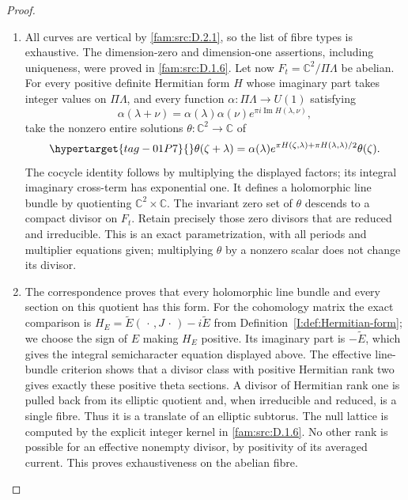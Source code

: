 \begin{proof}
\begin{enumerate}[label=\arabic*.,leftmargin=*]
\item \hypertarget{tag-000H}{}\label{app:rederive:fam-src-D.2.3}
All curves are vertical by \ref{fam:src:D.2.1}, so the list of fibre types is exhaustive.
The dimension-zero and dimension-one assertions, including uniqueness,
were proved in \ref{fam:src:D.1.6}. Let now $F_t=\mathbb C^2/\Pi\Lambda$ be abelian.
For every positive definite Hermitian form $H$ whose imaginary part takes
integer values on $\Pi\Lambda$, and every function
$\alpha:\Pi\Lambda\to U(1)$ satisfying
\[
 \alpha(\lambda+\nu)=\alpha(\lambda)\alpha(\nu)
                 e^{\pi i\operatorname{Im}H(\lambda,\nu)},
\]
take the nonzero entire solutions $\theta:\mathbb C^2\to\mathbb C$ of
\begin{equation}\hypertarget{tag-01P7}{}\label{fam:eq:cd-theta-sections}
 \theta(\zeta+\lambda)=\alpha(\lambda)
 e^{\pi H(\zeta,\lambda)+\pi H(\lambda,\lambda)/2}\theta(\zeta).
\end{equation}
The cocycle identity follows by multiplying the displayed factors; its
integral imaginary cross-term has exponential one. It defines a
holomorphic line bundle by quotienting $\mathbb C^2\times\mathbb C$.
The invariant zero set of $\theta$ descends to a compact divisor on
$F_t$. Retain precisely those zero divisors that are reduced and
irreducible. This is an exact parametrization, with all periods and
multiplier equations given; multiplying $\theta$ by a nonzero scalar
does not change its divisor.

\item The correspondence \cite[Theorem 4.1, p.~1, and equation (4.3), p.~2]{Schnell19} proves
that every holomorphic line bundle and every section on this quotient
has this form. For the cohomology matrix the exact comparison is
$H_E=\widetilde E(\,\cdot\,,J\,\cdot\,)-i\widetilde E$ from Definition~\ref{I:def:Hermitian-form};
we choose the sign of $E$ making $H_E$ positive. Its imaginary part is
$-\widetilde E$, which gives the integral semicharacter equation displayed
above. The effective line-bundle criterion \cite[pp.~2--3]{Schnell19} shows that
a divisor class with positive Hermitian rank two gives exactly
these positive theta sections. A divisor of Hermitian rank one is pulled
back from its elliptic quotient and, when irreducible and reduced, is a
single fibre. Thus it is a translate of an elliptic subtorus. The null
lattice is computed by the explicit integer kernel in \ref{fam:src:D.1.6}. No other
rank is possible for an effective nonempty divisor, by positivity of its
averaged current. This proves exhaustiveness on the abelian fibre.


\end{enumerate}
\end{proof}
